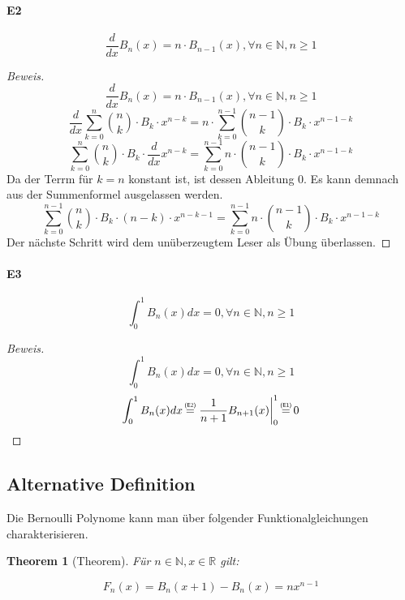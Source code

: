 \documentclass[12pt]{article}
\newcommand{\overtext}[2]{\mathrel{\overset{\makebox[0pt]{\mbox{\normalfont\tiny\sffamily #2}}}{#1}}}
\begin{document}
\paragraph{E2} 
\[\frac{d}{dx} B_n(x) = n \cdot B_{n-1}(x), \forall n\in\mathbb{N}, n \geq 1\]

\begin{proof}[Beweis]
\[\frac{d}{dx} B_n(x) = n \cdot B_{n-1}(x), \forall n\in\mathbb{N}, n \geq 1\]
\[\frac{d}{dx} \sum_{k=0}^n {n \choose k} \cdot B_k \cdot x^{n-k} = n \cdot \sum_{k=0}^{n-1} {n-1 \choose k} \cdot B_k \cdot x^{n-1-k}\]
\[\sum_{k=0}^n {n \choose k} \cdot B_k \cdot \frac{d}{dx} x^{n-k} = \sum_{k=0}^{n-1} n \cdot {n-1 \choose k} \cdot B_k \cdot x^{n-1-k}\]
Da der Terrm für \(k=n\) konstant ist, ist dessen Ableitung 0. Es kann demnach aus der Summenformel ausgelassen werden.
\[\sum_{k=0}^{n-1} {n \choose k} \cdot B_k \cdot (n-k) \cdot x^{n-k-1} = \sum_{k=0}^{n-1} n \cdot {n-1 \choose k} \cdot B_k \cdot x^{n-1-k}\]
Der nächste Schritt wird dem unüberzeugtem Leser als Übung überlassen.
\end{proof}

\paragraph{E3} 
\[\int_0^1 B_n(x) dx = 0, \forall n\in\mathbb{N}, n \geq 1\]

\begin{proof}[Beweis]
\[\int_0^1 B_n(x) dx = 0, \forall n\in\mathbb{N}, n \geq 1\]
\[\int_0^1 B_n(x) dx \overtext{=}{(E2)} \left. \frac{1}{n+1} B_{n+1}(x) \right|_0^1 \overtext{=}{(E1)} 0\]
\end{proof}

\subsection{Alternative Definition}

Die Bernoulli Polynome kann man über folgender Funktionalgleichungen charakterisieren.

\newtheorem{theorem}{Theorem}[section]
\begin{theorem}[Theorem]
Für \(n \in \mathbb{N}, x \in \mathbb{R}\) gilt:

\[F_n(x) = B_n(x+1) - B_n(x) = nx^{n-1}\]
\end{theorem}
\end{document}

